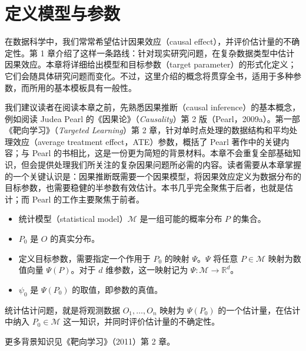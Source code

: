\chapter{定义模型与参数}
\label{ch:defining-model-parameter}

在数据科学中，我们常常希望估计因果效应（causal effect），并评价估计量的不确定性。第 1 章介绍了这样一条路线：针对现实研究问题，在复杂数据类型中估计因果效应。本章将详细给出模型和目标参数（target parameter）的形式化定义；它们会随具体研究问题而变化。不过，这里介绍的概念将贯穿全书，适用于多种参数，而所用的基本模板具有一般性。

我们建议读者在阅读本章之前，先熟悉因果推断（causal inference）的基本概念，例如阅读 Judea Pearl 的《因果论》（\emph{Causality}）第 2 版（Pearl，2009a）。第一部《靶向学习》（\emph{Targeted Learning}）第 2 章，针对单时点处理的数据结构和平均处理效应（average treatment effect，ATE）参数，概括了 Pearl 著作中的关键内容；与 Pearl 的书相比，这是一份更为简短的背景材料。本章不会重复全部基础知识，但会提供处理我们所关注的复杂因果问题所必需的内容。读者需要从本章掌握的一个关键认识是：因果推断既需要一个因果模型，将因果效应定义为数据分布的目标参数，也需要稳健的半参数有效估计。本书几乎完全聚焦于后者，也就是估计；而 Pearl 的工作主要聚焦于前者。

\begin{sourcebox}[关键定义与记号]
\begin{itemize}[leftmargin=1.5em,itemsep=.15em,topsep=.2em]
 \item 统计模型（statistical model）$\mathcal M$ 是一组可能的概率分布 $P$ 的集合。
 \item $P_0$ 是 $O$ 的真实分布。
 \item 定义目标参数，需要指定一个作用于 $P_0$ 的映射 $\Psi$。$\Psi$ 将任意 $P\in\mathcal M$ 映射为数值向量 $\Psi(P)$。对于 $d$ 维参数，这一映射记为 $\Psi\colon\mathcal M\to\mathbb R^d$。
 \item $\psi_0$ 是 $\Psi(P_0)$ 的取值，即参数的真值。
\end{itemize}
统计估计问题，就是将观测数据 $O_1,\ldots,O_n$ 映射为 $\Psi(P_0)$ 的一个估计量，在估计中纳入 $P_0\in\mathcal M$ 这一知识，并同时评价估计量的不确定性。

{\kaishu 更多背景知识见《靶向学习》（2011）第 2 章。}
\end{sourcebox}

